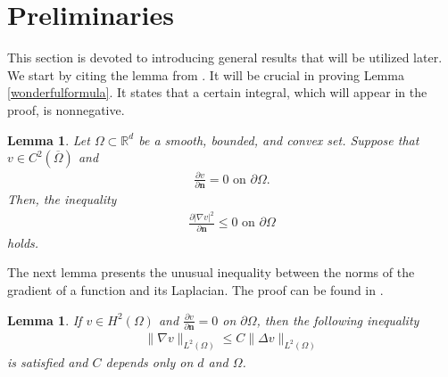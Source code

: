 \documentclass[11pt]{article}
\numberwithin{equation}{section}
\theoremstyle{plain}
\newtheorem{lem}[defi]{Lemma}
\newcommand\bb[1]{\mathbf{#1}}
\newcommand{\rn}{\mathbb{R}^d}
\newcommand{\htwo}{H^2(\Omega)}
\newcommand{\ld}{L^2(\Omega)}
\begin{document}
\section{Preliminaries}\label{prel}
This section is devoted to introducing general results that will be utilized later. We start by citing the lemma from \cite{EvansEntropy}. It will be crucial in proving Lemma \ref{wonderfulformula}. It states that a certain integral, which will appear in the proof, is nonnegative. 
\begin{lem}\label{Evansentr}
Let $\Omega\subset\rn$ be a smooth, bounded, and convex set. Suppose that $v\in C^2(\overline\Omega)$ and 
\begin{align*}
\frac{\partial v}{\partial\bb n}=0\textrm{ on }\partial\Omega.
\end{align*}
Then, the inequality
\begin{align*}
\frac{\partial|\nabla v|^2}{\partial\bb n}\leq 0\textrm{ on }\partial\Omega
\end{align*}
holds.
\end{lem}
The next lemma presents the unusual inequality between the norms of the gradient of a function and its Laplacian. The proof can be found in \cite{Fuestin}.
\begin{lem}\label{inpion}
If $v\in \htwo$ and $\frac{\partial v}{\partial \bb n}=0$ on $\partial\Omega$, then the following inequality
\begin{align*}
\|\nabla v\|_{\ld}\leq C\|\Delta v\|_{\ld}
\end{align*}
is satisfied and $C$ depends only on $d$ and $\Omega$.
\end{lem}
\end{document}

